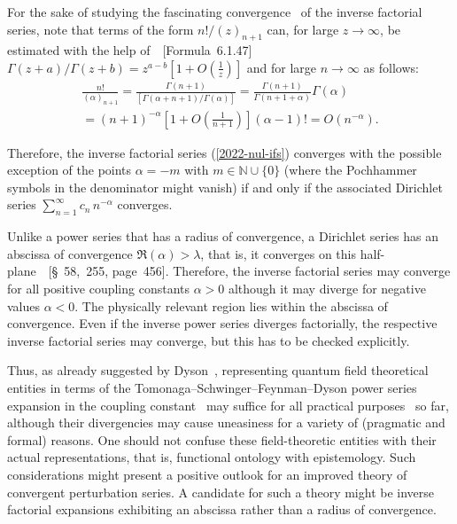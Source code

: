 \documentclass[axioms,article,accept,oneauthor,pdftex]{Definitions/mdpi}
\begin{document}
For the sake of studying the fascinating convergence~\cite{Nielsen-Gammafunktion,landau1906uber,Doetsch1972,Weniger2010} of the inverse factorial series,
note that terms of the form ${n!}/{(z)_{n+1}}$
can, for large $z\rightarrow \infty$,  be estimated  with the help of~\cite{abramowitz:1964:hmf}~[Formula~6.1.47]
$\Gamma(z+a)/\Gamma(z+b)= z^{a-b}\left[1 + O\left(\frac{1}{z}\right) \right]$
and for large $n \rightarrow \infty$ as follows:
\begin{equation}
\begin{split}
\frac{n!}{( \alpha )_{n+1}}
= \frac{\Gamma(n+1)}{\left[\Gamma( \alpha +n+1)/\Gamma( \alpha )\right]}
= \frac{\Gamma(n+1)}{\Gamma(n+1+\alpha)} \Gamma( \alpha )  \\
= (n+1)^{-\alpha}\left[1 + O\left(\frac{1}{n+1}\right) \right]( \alpha -1)!
= O \left( n^{-\alpha} \right).
\end{split}
\label{2022-m-ch-estimate}
\end{equation}

Therefore, the inverse factorial series (\ref{2022-nul-ifs})
converges with the possible
exception of the points $\alpha =-m$ with $m \in   \mathbb{N} \cup \{0\}$
(where the Pochhammer symbols in the denominator might vanish)
if and only if the associated Dirichlet series
$\sum_{n=1}^\infty c_n \, n^{-\alpha }$
converges.

Unlike a power series that has a radius of convergence, a Dirichlet series has an abscissa of convergence
$\Re ( \alpha ) > \lambda$, that is, it converges on this half-plane~\cite{Knoop1996}~[\S~58,~255, page~456].
Therefore, the inverse factorial series may converge for all positive coupling constants $\alpha >0$ although
it may diverge for negative values $\alpha < 0$. The physically relevant region lies within the abscissa of convergence.
Even if the inverse power series diverges factorially, the respective inverse factorial series may converge, but this has to be
checked explicitly.

Thus, as already suggested by Dyson~\cite{PhysRev.85.631},
representing quantum field theoretical entities in terms of the
Tomonaga--Schwinger--Feynman--Dyson power series expansion in the coupling constant~\cite{Dysen-49}
may suffice for all practical purposes~\cite{bell-a} so far,
although their divergencies may cause uneasiness for a variety of (pragmatic and formal) reasons.
One should not confuse these field-theoretic entities with their actual representations, that is,
functional ontology with epistemology.
Such considerations might present a positive outlook for an improved theory of convergent perturbation series.
A candidate for such a theory might be inverse factorial expansions exhibiting an abscissa rather than a radius of convergence.
\end{document}
